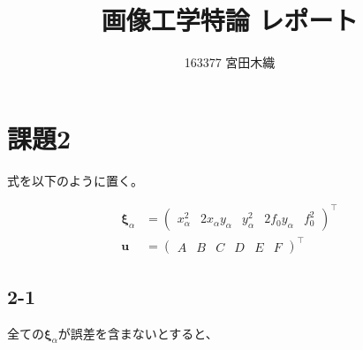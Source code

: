 \documentclass[12pt,a4j]{jsarticle}
\title{画像工学特論 レポート}
\author{163377 宮田木織}
\newcommand{\xa}{x_\alpha}
\newcommand{\ya}{y_\alpha}
\newcommand{\xia}{\bm{\xi}_\alpha}
\begin{document}
  \maketitle %

\section*{課題2}
  式を以下のように置く。

  \begin{align}
    \xia &= \begin{pmatrix}\xa^2 & 2\xa\ya & \ya^2 & 2f_0\ya & f_0^2\end{pmatrix}^\top \\
    \bm{u} &= \begin{pmatrix}A & B & C & D & E & F\end{pmatrix}^\top
  \end{align}

  \subsection*{2-1}

  全ての$\xia$が誤差を含まないとすると、
  
\end{document}
